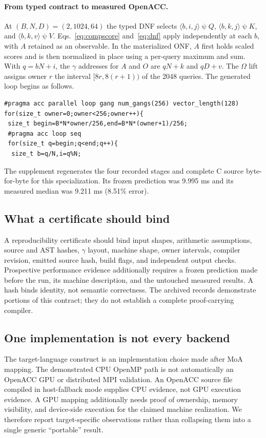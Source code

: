 \documentclass[sigplan,10pt,review,balance=false,pbalance=false]{acmart}
\newcommand{\ps}{\mathbin{\psi}}
\begin{document}
\paragraph{From typed contract to measured OpenACC.}
At $(B,N,D)=(2,1024,64)$ the typed DNF selects $\langle b,i,j\rangle\ps Q$, $\langle b,k,j\rangle\ps K$, and $\langle b,k,v\rangle\ps V$. Eqs.~\eqref{eq:compscore} and~\eqref{eq:dnf} apply independently at each $b$, with $A$ retained as an observable. In the materialized ONF, $A$ first holds scaled scores and is then normalized in place using a per-query maximum and sum. With $q=bN+i$, the $\gamma$ addresses for $A$ and $O$ are $qN+k$ and $qD+v$. The $\Omega$ lift assigns owner $r$ the interval $[8r,8(r+1))$ of the 2048 queries. The generated loop begins as follows.
\begin{lstlisting}[basicstyle=\ttfamily\scriptsize,columns=fullflexible,breaklines=true]
#pragma acc parallel loop gang num_gangs(256) vector_length(128)
for(size_t owner=0;owner<256;owner++){
 size_t begin=B*N*owner/256,end=B*N*(owner+1)/256;
 #pragma acc loop seq
 for(size_t q=begin;q<end;q++){
  size_t b=q/N,i=q%N;
\end{lstlisting}
The supplement regenerates the four recorded stages and complete C source byte-for-byte for this specialization. Its frozen prediction was 9.995 ms and its measured median was 9.211 ms (8.51\% error).

\subsection{What a certificate should bind}
A reproducibility certificate should bind input shapes, arithmetic assumptions, source and AST hashes, $\gamma$ layout, machine shape, owner intervals, compiler revision, emitted source hash, build flags, and independent output checks. Prospective performance evidence additionally requires a frozen prediction made before the run, its machine description, and the untouched measured results. A hash binds identity, not semantic correctness. The archived records demonstrate portions of this contract; they do not establish a complete proof-carrying compiler.

\subsection{One implementation is not every backend}
The target-language construct is an implementation choice made after MoA mapping. The demonstrated CPU OpenMP path is not automatically an OpenACC GPU or distributed MPI validation. An OpenACC source file compiled in host-fallback mode supplies CPU evidence, not GPU execution evidence. A GPU mapping additionally needs proof of ownership, memory visibility, and device-side execution for the claimed machine realization. We therefore report target-specific observations rather than collapsing them into a single generic ``portable'' result.
\end{document}
